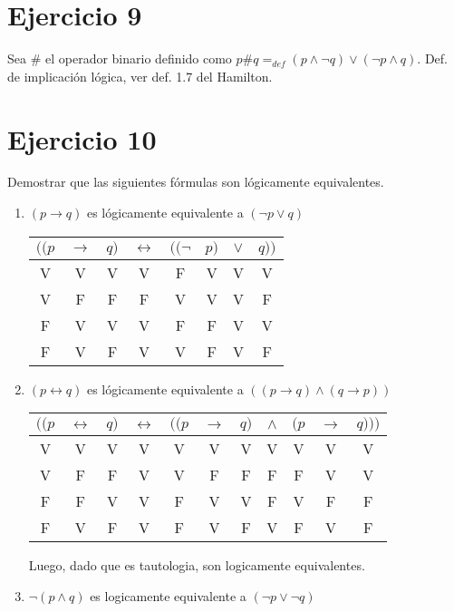 \documentclass[osajnl,twocolumn,showpacs,superscriptaddress,10pt]{revtex4-1} %
\begin{document}
\section{Ejercicio 9}

Sea \# el operador binario definido como $p\#q {=}_{def} (p \wedge \neg q) \vee (\neg p \wedge q)$. Def. de implicación lógica, ver def. 1.7 del Hamilton. \\

\section{Ejercicio 10}

Demostrar que las siguientes fórmulas son lógicamente equivalentes. \\

\begin{enumerate}[i-]
  \item $(p \rightarrow q)$ es lógicamente equivalente a $(\neg p \vee q)$ \\
  
  \begin{table}[h!]
    \setlength{\tabcolsep}{1.0em}
    \centering
    \begin{tabular}{ccc|c|cccc}
      $((p$ & $\rightarrow$ & $q)$ & $\leftrightarrow$ & $((\neg$ & $p)$ & $\vee$ & $q))$ \\
      \hline
      V & V & V & V & F & V & V & V \\
      V & F & F & F & V & V & V & F \\
      F & V & V & V & F & F & V & V \\
      F & V & F & V & V & F & V & F
    \end{tabular}
  \end{table}
  
  \item $(p \leftrightarrow q)$ es lógicamente equivalente a $((p \rightarrow q) \wedge (q \rightarrow p))$ \\
  
  \begin{table}[h!]
    \setlength{\tabcolsep}{1.0em}
    \centering
    \begin{tabular}{ccc|c|ccccccc}
      $((p$ & $\leftrightarrow$ & $q)$ & $\leftrightarrow$ & $((p$ & $\rightarrow$ & $q)$ & $\wedge$ & $(p$ & $\rightarrow$ & $q)))$ \\
      \hline
      V & V & V & V & V & V & V & V & V & V & V \\
      V & F & F & V & V & F & F & F & F & V & V \\
      F & F & V & V & F & V & V & F & V & F & F \\
      F & V & F & V & F & V & F & V & F & V & F
    \end{tabular}
  \end{table}
  
  Luego, dado que es tautologia, son logicamente equivalentes. \\
  
  \item $\neg (p \wedge q)$ es logicamente equivalente a $(\neg p \vee \neg q)$ \\
  
  \begin{table}
    
  \end{table}
\end{enumerate}
\end{document}
